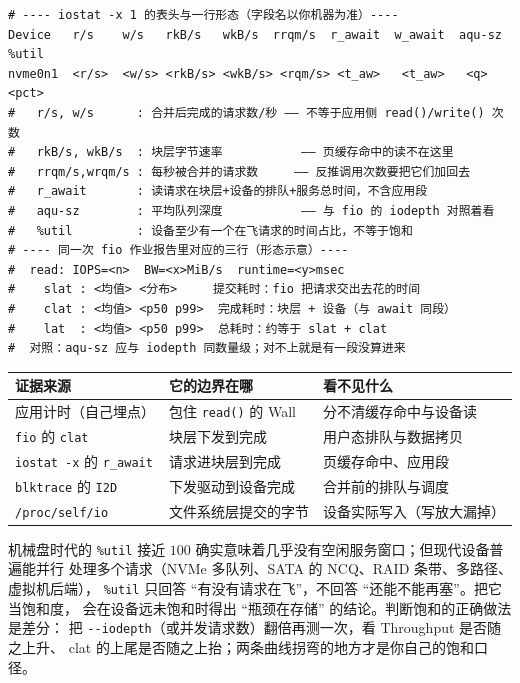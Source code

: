\documentclass[12pt,a4paper,fontset=fandol]{ctexbook}
\newcommand{\Fn}[1]{\texttt{#1()}}
\newcommand{\Tp}[1]{\texttt{#1}}
\newcommand{\Opt}[1]{\texttt{-\/-#1}}
\newcommand{\Lang}[1]{\textsf{#1}}
\newcommand{\MWall}{\Lang{Wall}}
\newcommand{\MThr}{\Lang{Throughput}}
\newcommand{\Mx}[1]{\textsf{#1}}
\begin{document}
\begin{lstlisting}[style=outstyle,caption={四段分账的字段对照（格式示例，非本仓库实测值；尖括号内为待填量）},label={lst:pm08-fields}]
# ---- iostat -x 1 的表头与一行形态（字段名以你机器为准）----
Device   r/s    w/s   rkB/s   wkB/s  rrqm/s  r_await  w_await  aqu-sz  %util
nvme0n1  <r/s>  <w/s> <rkB/s> <wkB/s> <rqm/s> <t_aw>   <t_aw>   <q>     <pct>
#   r/s, w/s      : 合并后完成的请求数/秒 —— 不等于应用侧 read()/write() 次数
#   rkB/s, wkB/s  : 块层字节速率           —— 页缓存命中的读不在这里
#   rrqm/s,wrqm/s : 每秒被合并的请求数     —— 反推调用次数要把它们加回去
#   r_await       : 读请求在块层+设备的排队+服务总时间，不含应用段
#   aqu-sz        : 平均队列深度           —— 与 fio 的 iodepth 对照着看
#   %util         : 设备至少有一个在飞请求的时间占比，不等于饱和
# ---- 同一次 fio 作业报告里对应的三行（形态示意）----
#  read: IOPS=<n>  BW=<x>MiB/s  runtime=<y>msec
#    slat : <均值> <分布>     提交耗时：fio 把请求交出去花的时间
#    clat : <均值> <p50 p99>  完成耗时：块层 + 设备（与 await 同段）
#    lat  : <均值> <p50 p99>  总耗时：约等于 slat + clat
#  对照：aqu-sz 应与 iodepth 同数量级；对不上就是有一段没算进来
\end{lstlisting}

\begin{compare}[title={应用侧证据与块层证据：谁看哪一段}]
\begin{tabular}{>{\raggedright\arraybackslash}p{} >{\raggedright\arraybackslash}p{} >{\raggedright\arraybackslash}p{}}
\toprule
证据来源 & 它的边界在哪 & 看不见什么 \\
\midrule
应用计时（自己埋点） & 包住 \Fn{read} 的 \MWall{} & 分不清缓存命中与设备读 \\
\Tp{fio} 的 \Tp{clat} & 块层下发到完成 & 用户态排队与数据拷贝 \\
\Tp{iostat -x} 的 \Tp{r\_await} & 请求进块层到完成 & 页缓存命中、应用段 \\
\Tp{blktrace} 的 \Tp{I2D} & 下发驱动到设备完成 & 合并前的排队与调度 \\
\Tp{/proc/self/io} & 文件系统层提交的字节 & 设备实际写入（写放大漏掉） \\
\bottomrule
\end{tabular}
\end{compare}

\begin{warning}[title={默认值陷阱：\%util 被当成 ``设备已经满了''}]
机械盘时代的 \Tp{\%util} 接近 $100$ 确实意味着几乎没有空闲服务窗口；但现代设备普遍能并行
处理多个请求（NVMe 多队列、SATA 的 NCQ、RAID 条带、多路径、虚拟机后端），
\Tp{\%util} 只回答 ``有没有请求在飞''，不回答 ``还能不能再塞''。把它当饱和度，
会在设备远未饱和时得出 ``瓶颈在存储'' 的结论。判断饱和的正确做法是差分：
把 \Opt{iodepth}（或并发请求数）翻倍再测一次，看 \MThr{} 是否随之上升、
\Mx{clat} 的上尾是否随之上抬；两条曲线拐弯的地方才是你自己的饱和口径。
\end{warning}
\end{document}

